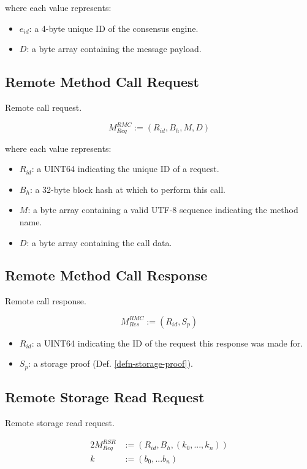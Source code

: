 \documentclass{book}
\begin{document}
where each value represents:

\begin{itemize}
    \item $e_{id}$: a 4-byte unique ID of the consensus engine.
    \item $D$: a byte array containing the message payload.
\end{itemize}

\subsection{Remote Method Call Request}

Remote call request.

\[
    M^{RMC}_{Req} := (R_{id}, B_h, M, D)
\]

where each value represents:

\begin{itemize}
    \item $R_{id}$: a UINT64 indicating the unique ID of a request.
    \item $B_h$: a 32-byte block hash at which to perform this call.
    \item $M$: a byte array containing a valid UTF-8 sequence indicating the
    method name.
    \item $D$: a byte array containing the call data.
\end{itemize}

\subsection{Remote Method Call Response}

Remote call response.

\[
    M^{RMC}_{Res} := (R_{id}, S_p)
\]

\begin{itemize}
    \item $R_{id}$: a UINT64 indicating the ID of the request this response was
    made for.
    \item $S_p$: a storage proof (Def. \ref{defn-storage-proof}).
\end{itemize}

\subsection{Remote Storage Read Request}

Remote storage read request.

\begin{alignat*}{2}
    M^{RSR}_{Req} &:= (R_{id}, B_h, (k_0, ..., k_n)) \\
    k &:= (b_0, ... b_n)
\end{alignat*}
\end{document}
